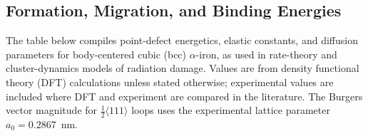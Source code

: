 \documentclass[pdflatex,sn-basic]{sn-jnl} %
\begin{document}
\subsection{Formation, Migration, and Binding Energies}
The table below compiles point-defect energetics, elastic constants, and
diffusion parameters for body-centered cubic (bcc) $\alpha$-iron, as used in
rate-theory and cluster-dynamics models of radiation damage.
Values are from density functional theory (DFT) calculations unless stated
otherwise; experimental values are included where DFT and experiment are
compared in the literature.
The Burgers vector magnitude for $\frac{1}{2}\langle 111\rangle$ loops
uses the experimental lattice parameter $a_0 = 0.2867$~nm.
\bigskip

\begingroup
\footnotesize
\setlength{\tabcolsep}{4pt}
\renewcommand{\arraystretch}{1.08}
\end{document}
